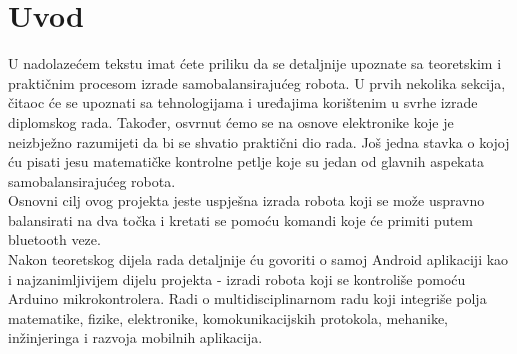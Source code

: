 \documentclass[../Document.tex]{subfiles}
\begin{document}
\section{Uvod}

U nadolazećem tekstu imat ćete priliku da se detaljnije upoznate sa teoretskim i praktičnim procesom izrade samobalansirajućeg robota. U prvih nekolika sekcija, čitaoc će se upoznati sa tehnologijama i uređajima korištenim u svrhe izrade diplomskog rada. Također, osvrnut ćemo se na osnove elektronike koje je neizbježno razumijeti da bi se shvatio praktični dio rada. Još jedna stavka o kojoj ću pisati jesu matematičke kontrolne petlje koje su jedan od glavnih aspekata samobalansirajućeg robota.\\

\noindent Osnovni cilj ovog projekta jeste uspješna izrada robota koji se može uspravno balansirati na dva točka i kretati se pomoću komandi koje će primiti putem bluetooth veze.\\

\noindent Nakon teoretskog dijela rada detaljnije ću govoriti o samoj Android aplikaciji kao i najzanimljivijem dijelu projekta - izradi robota koji se kontroliše pomoću Arduino mikrokontrolera. Radi o multidisciplinarnom radu koji integriše polja matematike, fizike, elektronike, komokunikacijskih protokola, mehanike, inžinjeringa i razvoja mobilnih aplikacija.
\end{document}
